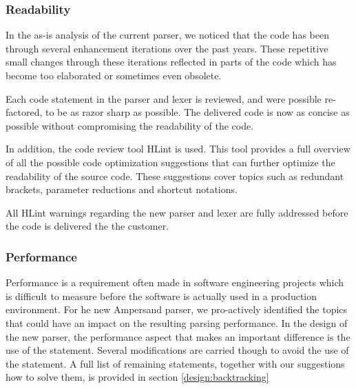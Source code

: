 \subsubsection{Readability}
  In the as-is analysis of the current parser, we noticed that the code has been through several enhancement iterations over the past years.
  These repetitive small changes through these iterations reflected in parts of the code which has become too elaborated or sometimes even obsolete.

  Each code statement in the parser and lexer is reviewed, and were possible re-factored, to be as razor sharp as possible. 
  The delivered code is now as concise as possible without compromising the readability of the code.

  In addition, the code review tool HLint is used.
  This tool provides a full overview of all the possible code optimization suggestions that can further optimize the readability of the source code. 
  These suggestions cover topics such as redundant brackets, parameter reductions and shortcut notations.

  All HLint warnings regarding the new parser and lexer are fully addressed before the code is delivered the the customer.

\subsubsection{Performance}
  Performance is a requirement often made in software engineering projects which is difficult to measure before the software is actually used in a production environment.
  For he new Ampersand parser, we pro-actively identified the topics that could have an impact on the resulting parsing performance.
  In the design of the new parser, the performance aspect that makes an important difference is the use of the  statement.
  Several modifications are carried though to avoid the use of the  statement. 
  A full list of remaining  statements, together with our suggestions how to solve them, is provided in section \autoref{design:backtracking}
